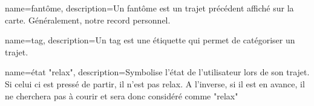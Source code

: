 % 


{
    name=fantôme,
    description={Un fantôme est un trajet précédent affiché sur la carte. Généralement, notre record personnel.}
}

{
    name=tag,
    description={Un tag est une étiquette qui permet de catégoriser un trajet.}
}

{
    name={état "relax"},
    description={Symbolise l'état de l'utilisateur lors de son trajet. Si celui ci est pressé de partir, il n'est pas relax. A l'inverse, si il est en avance, il ne cherchera pas à courir et sera donc considéré comme "relax"}
}


